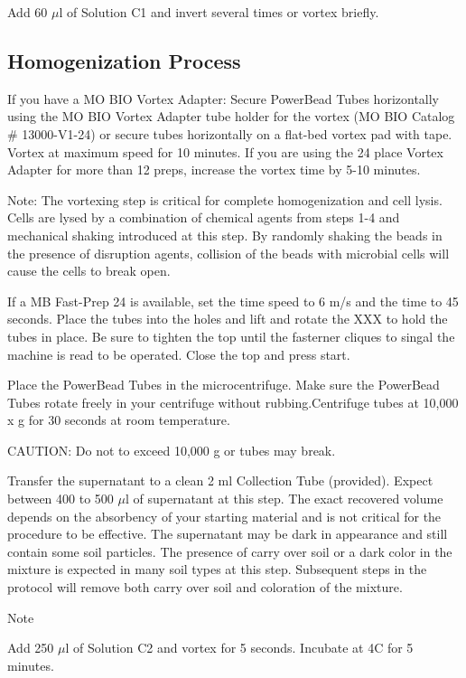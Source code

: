 \documentclass[12pt]{../SOP3_alpha}
\begin{document}
\NP Add 60 $\mu$l of Solution C1 and invert several times or vortex briefly.

\subsection*{Homogenization Process} 

\NP If you have a MO BIO Vortex Adapter: Secure PowerBead Tubes horizontally using the MO BIO Vortex Adapter tube holder for the vortex (MO BIO Catalog \# 13000-V1-24) or secure tubes
horizontally on a flat-bed vortex pad with tape. Vortex at maximum speed for 10 minutes. If you are using the 24 place Vortex Adapter for more than 12 preps, increase the vortex time by 5-10 minutes. 

\noindent Note: The vortexing step is critical for complete homogenization and cell lysis. Cells are lysed by a combination of chemical agents from steps 1-4 and mechanical shaking introduced at this step. By randomly shaking the beads in the presence of disruption agents, collision of the beads with microbial cells will cause the cells to break open.

\NP If a MB Fast-Prep 24 is available, set the time speed to 6 m/s and the time to 45 seconds. Place the tubes into the holes and lift and rotate the XXX to hold the tubes in place. Be sure to tighten the top until the fasterner cliques to singal the machine is read to be operated. Close the top and press start.


\NP Place the PowerBead Tubes in the microcentrifuge. Make sure the PowerBead Tubes rotate freely in your centrifuge without rubbing.Centrifuge tubes at 10,000 x g for 30 seconds at room temperature. 

\noindent CAUTION: Do not to exceed 10,000 g or tubes may break.

\NP Transfer the supernatant to a clean 2 ml Collection Tube (provided). Expect between 400 to 500 $\mu$l of supernatant at this step. The exact recovered volume depends on the absorbency of
your starting material and is not critical for the procedure to be effective. The supernatant may be dark in appearance and still contain some soil particles. The presence of carry over soil or a dark color in the mixture is expected in many
soil types at this step. Subsequent steps in the protocol will remove both carry over soil and coloration of the mixture.

Note

\NP Add 250 $\mu$l of Solution C2 and vortex for 5 seconds. Incubate at 4\degree C for 5
minutes.
\end{document}
